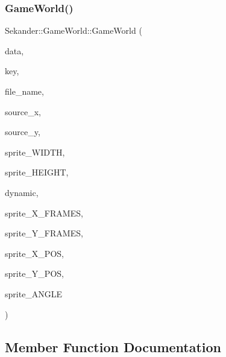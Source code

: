 \mbox{\label{classSekander_1_1GameWorld_a7e626b7986bea0d59a262aac5f47f0cd}} 
\subsubsection{\texorpdfstring{Game\+World()}{GameWorld()}\hspace{0.1cm}{\footnotesize\ttfamily [3/3]}}
{\footnotesize\ttfamily Sekander\+::\+Game\+World\+::\+Game\+World (\begin{DoxyParamCaption}\item[{\hyperlink{namespaceSekander_a1d69b002ba2d23020901c28f0def5e16}{Game\+Data\+Ref}}]{data,  }\item[{std\+::string}]{key,  }\item[{std\+::string}]{file\+\_\+name,  }\item[{int}]{source\+\_\+x,  }\item[{int}]{source\+\_\+y,  }\item[{int}]{sprite\+\_\+\+W\+I\+D\+TH,  }\item[{int}]{sprite\+\_\+\+H\+E\+I\+G\+HT,  }\item[{bool}]{dynamic,  }\item[{int}]{sprite\+\_\+\+X\+\_\+\+F\+R\+A\+M\+ES,  }\item[{int}]{sprite\+\_\+\+Y\+\_\+\+F\+R\+A\+M\+ES,  }\item[{float}]{sprite\+\_\+\+X\+\_\+\+P\+OS,  }\item[{float}]{sprite\+\_\+\+Y\+\_\+\+P\+OS,  }\item[{float}]{sprite\+\_\+\+A\+N\+G\+LE }\end{DoxyParamCaption})\hspace{0.3cm}{\ttfamily [explicit]}}



\subsection{Member Function Documentation}
\mbox{\label{classSekander_1_1GameWorld_ad5c3fd7f0c1347d393df075cea46177e}} 
